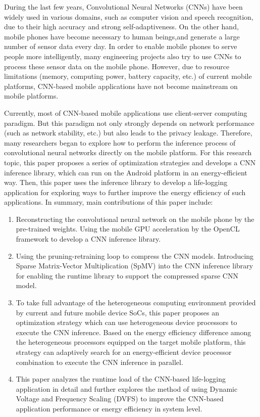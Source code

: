 \begin{enabstract}
During the last few years, Convolutional Neural Networks (CNNs) have been widely used in various domains, such as computer vision and speech recognition, due to their high accuracy and strong self-adaptiveness. On the other hand, mobile phones have become necessary to human beings,and generate a large number of sensor data every day. In order to enable mobile phones to serve people more intelligently, many engineering projects also try to use CNNs to process these sensor data on the mobile phone. However, due to resource limitations (memory, computing power, battery capacity, etc.) of current mobile platforms, CNN-based mobile applications have not become mainstream on mobile platforms.

Currently, most of CNN-based mobile applications use client-server computing paradigm. But this paradigm not only strongly depends on network performance (such as network stability, etc.) but also leads to the privacy leakage. Therefore, many researchers began to explore how to perform the inference process of convolutional neural networks directly on the mobile platform. For this research topic, this paper proposes a series of optimization strategies and develops a CNN inference library, which can run on the Android platform in an energy-efficient way. Then, this paper uses the inference library to develop a life-logging application for exploring ways to further improve the energy efficiency of such applications. In summary, main contributions of this paper include:

\begin{enumerate}
  \item Reconstructing the convolutional neural network on the mobile phone by the pre-trained weights. Using the mobile GPU acceleration by the OpenCL framework to develop a CNN inference library.
  \item Using the pruning-retraining loop to compress the CNN models. Introducing Sparse Matrix-Vector Multiplication (SpMV) into the CNN inference library for enabling the runtime library to support the compressed sparse CNN model.
  \item To take full advantage of the heterogeneous computing environment provided by current and future mobile device SoCs,  this paper proposes an optimization strategy which can use heterogeneous device processors to execute the CNN inference. Based on the energy efficiency difference among the heterogeneous processors equipped on the target mobile platform, this strategy can adaptively search for an energy-efficient device processor combination to execute the CNN inference in parallel.
  \item This paper analyzes the runtime load of the CNN-based life-logging application in detail and further explores the method of using Dynamic Voltage and Frequency Scaling (DVFS) to improve the CNN-based application performance or energy efficiency in system level.
\end{enumerate}


\end{enabstract}
